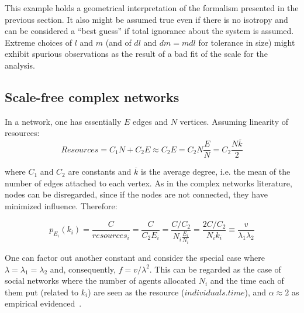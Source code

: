 \documentclass[a4paper, 11pt]{article} %
\begin{document}
This example holds a geometrical
interpretation of the formalism presented in the previous section.
It also might be assumed true even if there is no isotropy
and can be considered a ``best guess'' if total ignorance
about the system is assumed. 
Extreme choices of $l$ and $m$ (and of $dl$ and $dm=mdl$ for tolerance in size)
might exhibit spurious observations
as the result of a bad fit of the scale for the analysis.

\subsection{Scale-free complex networks}

In a network, one has essentially $E$ edges and $N$ vertices.
Assuming linearity of resources:
\begin{equation}\label{eq:nre}
	Resources=C_1 N + C_2 E \approx C_2 E = C_2 N \frac{E}{N} = C_2 \frac{N \overline{k}}{2}
\end{equation}

\noindent where $C_1$ and $C_2$ are constants and $\overline{k}$ is
the average degree, i.e. the mean of the number of edges attached to each vertex.
As in the complex networks literature, nodes can be disregarded, since if the nodes
are not connected, they have minimized influence.
Therefore:

\begin{equation}\label{eq:eqf}
	p_{E_i}(k_i)=\frac{C}{resources_i}=\frac{C}{C_2 E_i}=\frac{C/C_2}{N_i \frac{E_i}{N_i}}=\frac{2C/C_2}{N_i k_i} \equiv \frac{v}{\lambda_1   \lambda_2}
\end{equation}

One can factor out another constant and consider the special case where $\lambda=\lambda_1=\lambda_2$ and, consequently, $f=v/\lambda^2$.
This can be regarded as the case of social networks where the number of agents allocated $N_i$ and the time each of them put (related to $k_i$) are seen as the resource ($individuals . time$), and $\alpha\approx 2$
as empirical evidenced~\cite{newman}.

% 
\end{document}
